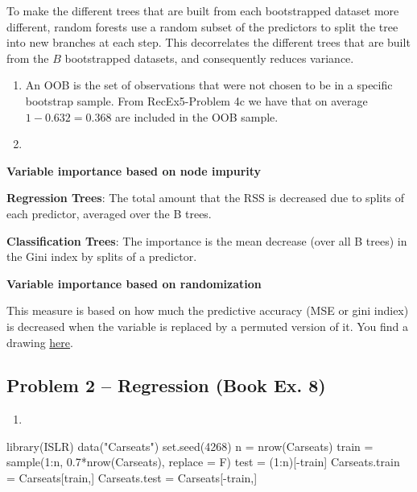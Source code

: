 \documentclass[
]{article}
\newenvironment{Shaded}{\begin{snugshade}}{\end{snugshade}}
\newcommand{\AttributeTok}[1]{\textcolor[rgb]{0.77,0.63,0.00}{#1}}
\newcommand{\DecValTok}[1]{\textcolor[rgb]{0.00,0.00,0.81}{#1}}
\newcommand{\FloatTok}[1]{\textcolor[rgb]{0.00,0.00,0.81}{#1}}
\newcommand{\FunctionTok}[1]{\textcolor[rgb]{0.00,0.00,0.00}{#1}}
\newcommand{\NormalTok}[1]{#1}
\newcommand{\OtherTok}[1]{\textcolor[rgb]{0.56,0.35,0.01}{#1}}
\newcommand{\SpecialCharTok}[1]{\textcolor[rgb]{0.00,0.00,0.00}{#1}}
\newcommand{\StringTok}[1]{\textcolor[rgb]{0.31,0.60,0.02}{#1}}
\providecommand{\tightlist}{%
  \setlength{\itemsep}{0pt}\setlength{\parskip}{0pt}}
\begin{document}
To make the different trees that are built from each bootstrapped
dataset more different, random forests use a random subset of the
predictors to split the tree into new branches at each step. This
decorrelates the different trees that are built from the \(B\)
bootstrapped datasets, and consequently reduces variance.

\begin{enumerate}
\def\labelenumi{\alph{enumi})}
\setcounter{enumi}{3}
\item
  An OOB is the set of observations that were not chosen to be in a
  specific bootstrap sample. From RecEx5-Problem 4c we have that on
  average \(1-0.632 = 0.368\) are included in the OOB sample.
\item
\end{enumerate}

\textbf{Variable importance based on node impurity}

\textbf{Regression Trees}: The total amount that the RSS is decreased
due to splits of each predictor, averaged over the B trees.

\textbf{Classification Trees}: The importance is the mean decrease (over
all B trees) in the Gini index by splits of a predictor.

\textbf{Variable importance based on randomization}

This measure is based on how much the predictive accuracy (MSE or gini
indiex) is decreased when the variable is replaced by a permuted version
of it. You find a drawing
\href{https://github.com/stefaniemuff/statlearning/blob/master/8Trees/M8_variableImportanceRandomization.pdf}{here}.

\hypertarget{problem-2-regression-book-ex.-8}{%
\subsection{Problem 2 -- Regression (Book Ex.
8)}\label{problem-2-regression-book-ex.-8}}

\begin{enumerate}
\def\labelenumi{\alph{enumi})}
\tightlist
\item
\end{enumerate}

\begin{Shaded}
\begin{Highlighting}[]
\FunctionTok{library}\NormalTok{(ISLR)}
\FunctionTok{data}\NormalTok{(}\StringTok{"Carseats"}\NormalTok{)}
\FunctionTok{set.seed}\NormalTok{(}\DecValTok{4268}\NormalTok{)}
\NormalTok{n }\OtherTok{=} \FunctionTok{nrow}\NormalTok{(Carseats)}
\NormalTok{train }\OtherTok{=} \FunctionTok{sample}\NormalTok{(}\DecValTok{1}\SpecialCharTok{:}\NormalTok{n, }\FloatTok{0.7}\SpecialCharTok{*}\FunctionTok{nrow}\NormalTok{(Carseats), }\AttributeTok{replace =}\NormalTok{ F)}
\NormalTok{test }\OtherTok{=}\NormalTok{ (}\DecValTok{1}\SpecialCharTok{:}\NormalTok{n)[}\SpecialCharTok{{-}}\NormalTok{train]}
\NormalTok{Carseats.train }\OtherTok{=}\NormalTok{ Carseats[train,]}
\NormalTok{Carseats.test }\OtherTok{=}\NormalTok{ Carseats[}\SpecialCharTok{{-}}\NormalTok{train,]}
\end{Highlighting}
\end{Shaded}
\end{document}
